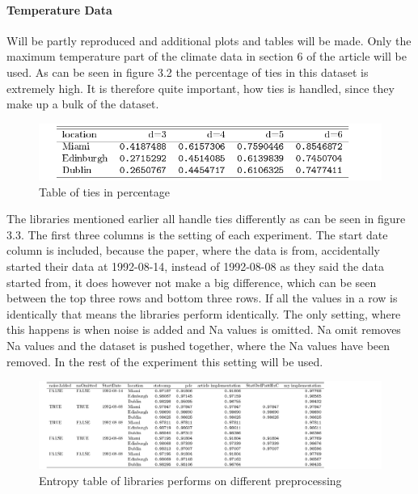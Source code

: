 \FloatBarrier

\paragraph{Temperature Data}
\cite{Chagas2022} Will be partly reproduced and additional plots and tables will be made. Only the maximum temperature part of the climate data in section 6 of the article will be used. As can be seen in figure 3.2 the percentage of ties in this dataset is extremely high. It is therefore quite important, how ties is handled, since they make up a bulk of the dataset. 
\begin{figure}
    \centering
    \includegraphics{Weather/tiesTable.pdf}
    \caption{Table of ties in percentage}
\end{figure}


The libraries mentioned earlier all handle ties differently as can be seen in figure 3.3. The first three columns is the setting of each experiment. The start date column is included, because the paper, where the data is from, accidentally started their data at 1992-08-14, instead of 1992-08-08 as they said the data started from, it does however not make a big difference, which can be seen between the top three rows and bottom three rows.  If all the values in a row is identically that means the libraries perform identically. The only setting, where this happens is when noise is added and Na values is omitted. Na omit removes Na values and the dataset is pushed together, where the Na values have been removed. In the rest of the experiment this setting will be used. 

\begin{figure}
    \centering
    \includegraphics[width=\textwidth,keepaspectratio]{Weather/entropyTable.pdf}
    \caption{Entropy table of libraries performs on different preprocessing}
\end{figure}

